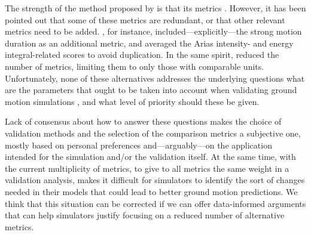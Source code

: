 The strength of the method proposed by \citet{Anderson_2004_Proc} is that its metrics . However, it has been pointed out that some of these metrics are redundant, or that other relevant metrics need to be added. \citet{Taborda_2013_BSSA}, for instance, included---explicitly---the strong motion duration \citep{Trifunac_1975_BSSA} as an additional metric, and averaged the Arias intensity- and energy integral-related scores to avoid duplication. In the same spirit, \citet{Maufroy_2015_BSSA} reduced the number of metrics, limiting them to only those with comparable units. Unfortunately, none of these alternatives addresses the underlying questions  what are the  parameters that ought to be taken into account when validating ground motion simulations , and what level of priority should these  be given.

Lack of consensus about how to answer these questions makes the choice of validation methods and the selection of the comparison metrics a subjective one, mostly based on personal preferences and---arguably---on the application intended for the simulation and/or the validation itself. At the same time, with the current multiplicity of metrics, to give to all metrics the same weight in a validation analysis, makes it difficult for simulators to identify the sort of changes needed in their models that could lead to better ground motion predictions. We think that this situation can be corrected if we can offer data-informed arguments that can help simulators justify focusing on a reduced number of alternative metrics.

